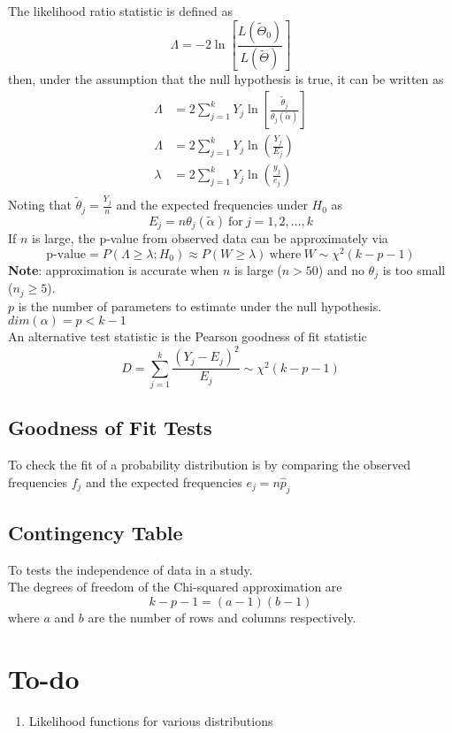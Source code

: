\documentclass[12pt]{article}
\theoremstyle{definition}
\begin{document}
  The likelihood ratio statistic is defined as
  $$\Lambda = -2\ln\left[\frac{L(\widetilde{\Theta}_{0})}{L(\widetilde{\Theta})}\right]$$
  then, under the assumption that the null hypothesis is true, it can be written as
  \begin{align*}
    \Lambda &= 2\sum_{j=1}^{k}
    Y_{j}\ln\left[\frac{\widetilde{\theta}_{j}}{\theta_{j}(\widetilde{\alpha})}\right] \\
    \Lambda &= 2\sum_{j=1}^{k}Y_{j}\ln\left(\frac{Y_{j}}{E_{j}}\right) \\
    \lambda &= 2\sum_{j=1}^{k}Y_{j}\ln\left(\frac{y_{j}}{e_{j}}\right) \\
  \end{align*}
  Noting that $\widetilde{\theta}_{j} = \frac{Y_{j}}{n}$ and the expected frequencies under $H_0$ as
  $$E_{j} = n\theta_{j}(\widetilde{\alpha}) ~\text{for}~j=1, 2, \dots, k$$
  If $n$ is large, the p-value from observed data can be approximately via
  \[
  \text{p-value} = P(\Lambda \geq \lambda; H_{0}) \approx P(W \geq \lambda)
  ~\text{where}~ W \sim \chi^{2}(k - p - 1)
  \]
  \textbf{Note}: approximation is accurate when $n$ is large ($n > 50$) and no $\theta_{j}$ is too small ($n_{j} \geq 5$). \\
  $p$ is the number of parameters to estimate under the null hypothesis. \\
  $dim(\alpha) = p < k - 1$ \\

  An alternative test statistic is the Pearson goodness of fit statistic
  $$D = \sum_{j=1}^{k}\frac{(Y_{j} - E_{j})^{2}}{E_{j}} \sim \chi^{2}(k - p - 1)$$

  \subsection{Goodness of Fit Tests}
  To check the fit of a probability distribution is by comparing the observed frequencies $f_{j}$ and the expected frequencies $e_{j} = n\hat{p}_{j}$

  \subsection{Contingency Table}
  To tests the independence of data in a study. \\

  The degrees of freedom of the Chi-squared approximation are
  $$k - p - 1 = (a - 1)(b - 1)$$
  where $a$ and $b$ are the number of rows and columns respectively.

  \newpage
  \section{To-do}
  \begin{enumerate}
    \item Likelihood functions for various distributions
  \end{enumerate}
\end{document}
